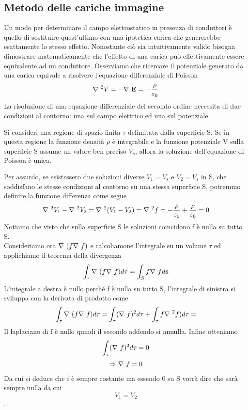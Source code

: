 \documentclass[
10pt, %
a4paper, %
oneside, %
headinclude,footinclude, %
BCOR5mm, %
]{scrartcl}
\begin{document}
\subsection{Metodo delle cariche immagine}
Un modo per determinare il campo elettrostatico in presenza di conduttori è quello di sostituire quest'ultimo con una ipotetica carica che genererebbe esattamente lo stesso effetto. Nonostante ciò sia intuitivamente valido bisogna dimostrare matematicamente che l'effetto di una carica può effettivamente essere equivalente ad un conduttore. Osserviamo che ricercare il potenziale generato da una carica equivale a risolvere l'equazione differenziale di Poisson
\[{\nabla\ }^2 V = -\mathbf{\nabla\ }\mathbf{E}  = -\frac{\rho}{\varepsilon_0}\]
La risoluzione di una equazione differenziale del secondo ordine necessita di due condizioni al contorno: una sul campo elettrico ed una sul potenziale.
\begin{teorema}
	Si consideri una regione di spazio finita  \(\tau\)  delimitata dalla superficie S. Se in questa regione la funzione densità $\rho$ è integrabile e la funzione potenziale V sulla superficie S assume un valore ben preciso \(V_s\), allora la soluzione dell'equazione di Poisson è unica.
\end{teorema}
Per assurdo, se esistessero due soluzioni diverse \(V_1 = V_s\) e \(V_2 = V_s\) in S, che soddisfano le stesse condizioni al contorno su una stessa superficie S, potremmo definire la funzione differenza come segue
\[\nabla\ ^2 V_1 - \nabla\ ^2 V_2 = \nabla\ ^2(V_1 - V_2) = \nabla\ ^2 f = -\frac{\rho}{\varepsilon_0}+\frac{\rho}{\varepsilon_0}=0 \]
Notiamo che visto che sulla superficie S le soluzioni coincidono f è nulla su tutto S.\\
Consideriamo ora \(\mathbf{\nabla\ }(f\mathbf{\nabla\ }f)\) e calcoliamone l'integrale su un volume $\tau$ ed applichiamo il teorema della divergenza
\[\int_\tau \mathbf{\nabla\ }(f\mathbf{\nabla\ }f)d\tau= \int_Sf\mathbf{\nabla\ }fd\mathbf{s}\]
L'integrale a destra è nullo perché f è nulla su tutto S, l'integrale di sinistra si sviluppa con la derivata di prodotto come
\[\int_\tau \mathbf{\nabla\ }(f\mathbf{\nabla\ }f)d\tau = \int_\tau (\mathbf{\nabla\ }f )^2 d\tau + \int_\tau f{\nabla\ }^2f)d\tau = \]
Il laplaciano di f è nullo quindi il secondo addendo si annulla. Infine otteniamo
\[\int_\tau (\mathbf{\nabla\ }f )^2 d\tau=0\]
\[\Rightarrow \mathbf{\nabla\ }f = 0\]
Da cui si deduce che f è sempre costante ma essendo 0 su S vorrà dire che sarà sempre nulla da cui \[V_1 = V_2\]. 
\\\\
\end{document}
